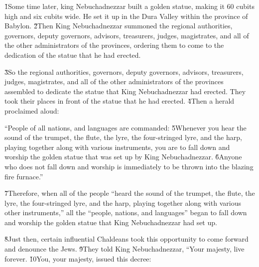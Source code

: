 \v{1}Some time later, king Nebuchadnezzar built a golden statue, making it 60 cubits high and six cubits wide. He set it up in the Dura Valley within the province of Babylon. \v{2}Then King Nebuchadnezzar summoned the regional authorities, governors, deputy governors, advisors, treasurers, judges, magistrates, and all of the other administrators of the provinces, ordering them to come to the dedication of the statue that he had erected.

\v{3}So the regional authorities, governors, deputy governors, advisors, treasurers, judges, magistrates, and all of the other administrators of the provinces assembled to dedicate the statue that King Nebuchadnezzar had erected. They took their places in front of the statue that he had erected. \v{4}Then a herald proclaimed aloud:

\begin{poetry}
\poeml ``People of all nations, and languages are commanded: \v{5}Whenever you hear the sound of the trumpet, the flute, the lyre, the four-stringed lyre, and the harp, playing together along with various instruments, you are to fall down and worship the golden statue that was set up by King Nebuchadnezzar. \v{6}Anyone who does not fall down and worship is immediately to be thrown into the blazing fire furnace.''
\end{poetry}

\v{7}Therefore, when all of the people ``heard the sound of the trumpet, the flute, the lyre, the four-stringed lyre, and the harp, playing together along with various other instruments,'' all the ``people, nations, and languages'' began to fall down and worship the golden statue that King Nebuchadnezzar had set up.

\v{8}Just then, certain influential Chaldeans took this opportunity to come forward and denounce the Jews. \v{9}They told King Nebuchadnezzar, ``Your majesty, live forever. \v{10}You, your majesty, issued this decree:


